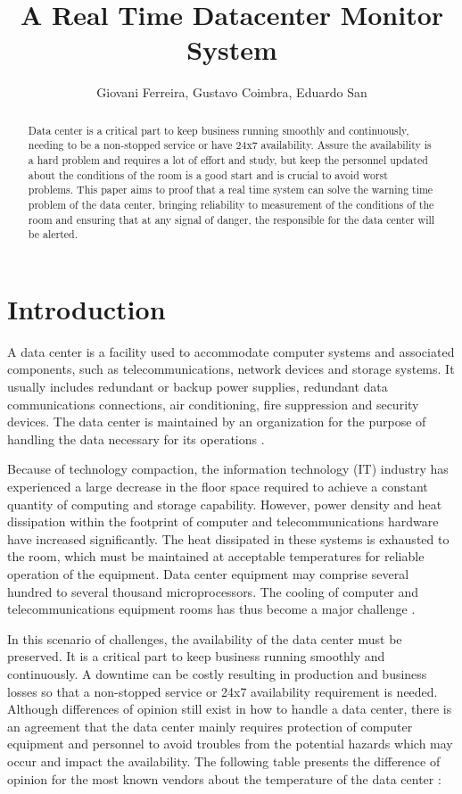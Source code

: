 \documentclass[12pt]{article}
\title{A Real Time Datacenter Monitor System}
\author{Giovani Ferreira\inst{1}, Gustavo Coimbra\inst{1}, Eduardo San\inst{1} }
\begin{document}
 

\maketitle

\begin{abstract}
Data center is a critical part to keep business running smoothly and continuously, needing to be a non-stopped service or 
have 24x7 availability. Assure the availability is a hard problem and requires a lot of effort and study, but keep the 
personnel updated about the conditions of the room is a good start and is crucial to avoid worst problems. This paper aims 
to proof that a real time system can solve the warning time problem of the data center, bringing reliability to measurement 
of the conditions of the room and ensuring that at any signal of danger, the responsible for the data center will be alerted.
\end{abstract}


\section{Introduction}

A data center is a facility used to accommodate computer systems and associated components, such as telecommunications, 
network devices and storage systems. It usually includes redundant or backup  power supplies, redundant data communications 
connections, air conditioning, fire suppression and security devices. The data center is maintained by an organization for 
the purpose of handling the data necessary for its operations \cite{janpitak2011data} \cite{hassan2013temperature}.

Because of technology compaction, the information technology (IT) industry has experienced a large decrease
in the floor space required to achieve a constant quantity of computing and storage capability. However, 
power density and heat dissipation within the footprint of computer and telecommunications hardware have 
increased significantly. The heat dissipated in these systems is exhausted to the room, which must be
maintained at acceptable temperatures for reliable operation of the equipment. Data center equipment may 
comprise several hundred to several thousand microprocessors. The cooling of computer and telecommunications 
equipment rooms has thus become a major challenge \cite{schmidt2005challenges}.

In this scenario of challenges, the availability of the data center must be preserved. It is a critical part to keep business 
running smoothly and continuously. A downtime can be costly resulting in production and business losses so that a non-stopped 
service or 24x7 availability requirement is needed. Although differences of opinion still exist in how to handle a data center, 
there is an agreement that the data center mainly requires protection of computer equipment and personnel to avoid troubles
from the potential hazards which may occur and impact the availability. The following table presents the difference
of opinion for the most known vendors about the temperature of the data center \cite{ashrae9} \cite{moss2011data} 
\cite{packard2013applying} \cite{moss2009data}:
\end{document}
